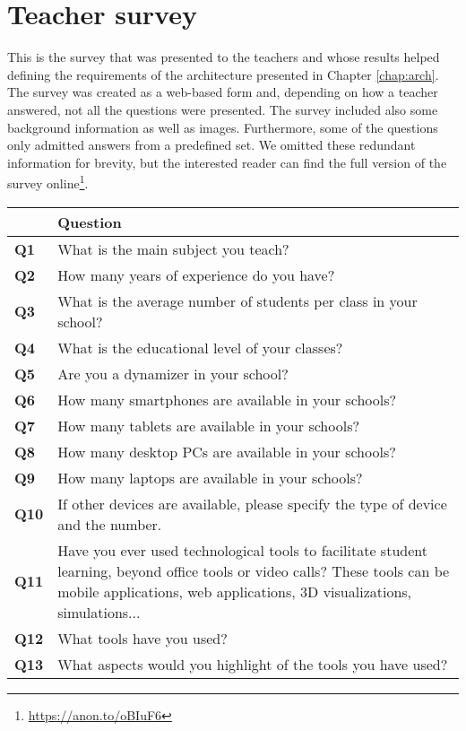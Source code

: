 \chapter{Teacher survey}
This is the survey that was presented to the teachers and whose results helped defining the requirements of the architecture presented in Chapter \ref{chap:arch}. The survey was created as a web-based form and, depending on how a teacher answered, not all the questions were presented. The survey included also some background information as well as images. Furthermore, some of the questions only admitted answers from a predefined set. We omitted these redundant information for brevity, but the interested reader can find the full version of the survey online\footnote{\url{https://anon.to/oBIuF6}}.

\begin{longtable}{p{}>{\arraybackslash}p{}}
\toprule
 & Question\\
\midrule
    \textbf{Q1} & What is the main subject you teach? \\
    \textbf{Q2} & How many years of experience do you have? \\
    \textbf{Q3} & What is the average number of students per class in your school? \\
    \textbf{Q4} & What is the educational level of your classes? \\
    \textbf{Q5} & Are you a dynamizer in your school? \\
    \textbf{Q6} & How many smartphones are available in your schools? \\
    \textbf{Q7} & How many tablets are available in your schools? \\
    \textbf{Q8} & How many desktop PCs are available in your schools? \\
    \textbf{Q9} & How many laptops are available in your schools? \\
    \textbf{Q10} & If other devices are available, please specify the type of device and the number. \\
    \textbf{Q11} & Have you ever used technological tools to facilitate student learning,
beyond office tools or video calls? These tools can be mobile applications, web
applications, 3D visualizations, simulations... \\
    \textbf{Q12} & What tools have you used? \\
    \textbf{Q13} & What aspects would you highlight of the tools you have used? \\

\end{longtable}
